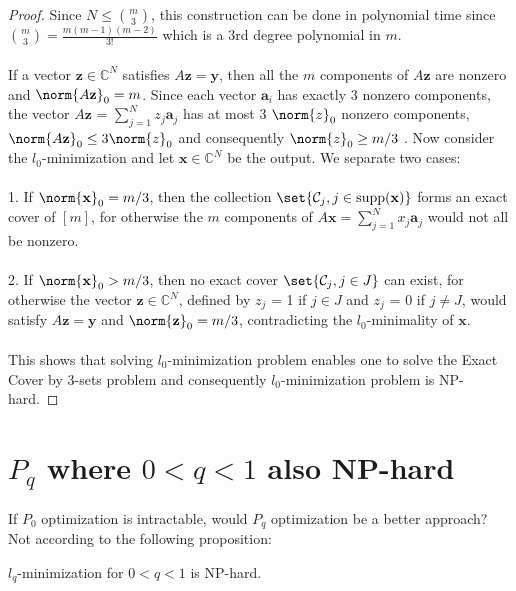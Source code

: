 \begin{proof}
Since $N \leq \binom{m}{3}$, this construction can be done in polynomial time since $\binom{m}{3} = \frac{m(m-1)(m-2)}{3!}$ which is a 3rd degree polynomial in $m$. 
\\
\\If a vector $\mathbf{z} \in \mathbb{C}^N$ satisfies $A\mathbf{z}=\mathbf{y}$, then all the $m$ components of $A\mathbf{z}$ are nonzero and $\norm{A\mathbf{z}}_0 = m$. Since each vector $\mathbf{a}_i$ has exactly 3 nonzero components, the vector $A\mathbf{z}$ = $\sum_{j=1}^{N}z_j\mathbf{a}_j$ has at most 3 $\norm{z}_0$ nonzero components, $\norm{A\mathbf{z}}_0 \leq 3 \norm{z}_0$ and consequently $\norm{z}_0 \geq m/3$ . Now consider the $l_0$-minimization  and let $\mathbf{x} \in \mathbb{C}^N$ be the output. We separate two cases:
\\
\\
1. If $\norm{\mathbf{x}}_0 = m/3$, then the collection $\set{\mathcal{C}_j, j \in \text{supp}(\mathbf{x})}$ forms an exact cover of $[m]$, for otherwise the $m$ components of $A\mathbf{x} = \sum_{j=1}^{N}x_j\mathbf{a}_j$ would not all be nonzero.
\\
\\
2. If $\norm{\mathbf{x}}_0 > m/3$, then no exact cover $\set{\mathcal{C}_j, j \in J}$ can exist, for otherwise the vector $\mathbf{z} \in \mathbb{C}^N$, defined by $z_j$ = 1 if $j \in J$ and $z_j$ = 0 if $j \neq J$, would satisfy $A\mathbf{z}=\mathbf{y}$ and $\norm{\mathbf{z}}_0 = m/3$, contradicting the $l_0$-minimality of $\mathbf{x}$. 
\\
\\
This shows that solving $l_0$-minimization problem enables one to solve the Exact Cover by 3-sets problem and consequently $l_0$-minimization problem is NP-hard. 
\end{proof}




\section*{$P_q$ where $0 < q < 1$ also NP-hard}



If $P_0$ optimization is intractable, would $P_q$ optimization be a better approach? Not according to the following proposition:


\begin{tcolorbox}[colback=green,colframe=white]
\begin{proposition}
$l_{q}$-minimization  for $0 < q < 1$ is NP-hard.
\end{proposition}
\end{tcolorbox}

